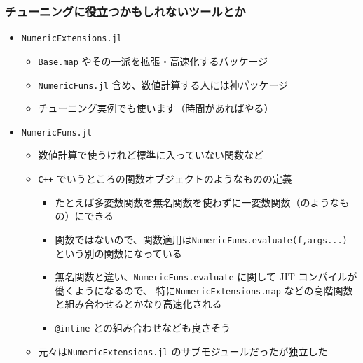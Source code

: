  \begin{frame}[containsverbatim]
 \frametitle{チューニングに役立つかもしれないツールとか}
 \begin{itemize}
   \item \verb|NumericExtensions.jl|
     \begin{itemize}
       \item \verb|Base.map| やその一派を拡張・高速化するパッケージ
       \item \verb|NumericFuns.jl| 含め、数値計算する人には神パッケージ
       \item チューニング実例でも使います（時間があればやる）
     \end{itemize}
   \item \verb|NumericFuns.jl|
     \begin{itemize}
       \item 数値計算で使うけれど標準に入っていない関数など
       \item \verb|C++| でいうところの関数オブジェクトのようなものの定義
         \begin{itemize}
           \item たとえば多変数関数を無名関数を使わずに一変数関数（のようなもの）にできる
           \item 関数ではないので、関数適用は\verb|NumericFuns.evaluate(f,args...)| という別の関数になっている 
           \item 無名関数と違い、\verb|NumericFuns.evaluate| に関して
             JIT コンパイルが働くようになるので、
             特に\verb|NumericExtensions.map| などの高階関数と組み合わせるとかなり高速化される
           \item \verb|@inline| との組み合わせなども良さそう
         \end{itemize}
       \item 元々は\verb|NumericExtensions.jl| のサブモジュールだったが独立した
     \end{itemize}
 \end{itemize}
 \end{frame}

